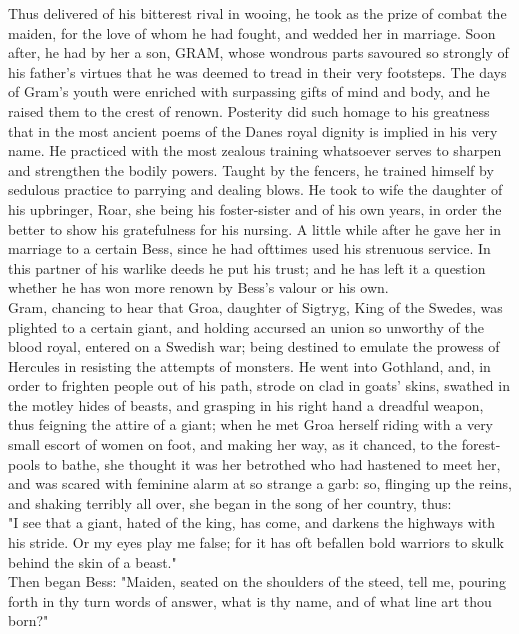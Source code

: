\documentclass[10pt,a4paper]{report}
\begin{document}
Thus delivered of his bitterest rival in wooing, he took as the prize of combat the maiden, for the love of whom he had fought, and wedded her in marriage. Soon after, he had by her a son, GRAM, whose wondrous parts savoured so strongly of his father's virtues that he was deemed to tread in their very footsteps. The days of Gram's youth were enriched with surpassing gifts of mind and body, and he raised them to the crest of renown. Posterity did such homage to his greatness that in the most ancient poems of the Danes royal dignity is implied in his very name. He practiced with the most zealous training whatsoever serves to sharpen and strengthen the bodily powers. Taught by the fencers, he trained himself by sedulous practice to parrying and dealing blows. He took to wife the daughter of his upbringer, Roar, she being his foster-sister and of his own years, in order the better to show his gratefulness for his nursing. A little while after he gave her in marriage to a certain Bess, since he had ofttimes used his strenuous service. In this partner of his warlike deeds he put his trust; and he has left it a question whether he has won more renown by Bess's valour or his own.\\

Gram, chancing to hear that Groa, daughter of Sigtryg, King of the Swedes, was plighted to a certain giant, and holding accursed an union so unworthy of the blood royal, entered on a Swedish war; being destined to emulate the prowess of Hercules in resisting the attempts of monsters. He went into Gothland, and, in order to frighten people out of his path, strode on clad in goats' skins, swathed in the motley hides of beasts, and grasping in his right hand a dreadful weapon, thus feigning the attire of a giant; when he met Groa herself riding with a very small escort of women on foot, and making her way, as it chanced, to the forest-pools to bathe, she thought it was her betrothed who had hastened to meet her, and was scared with feminine alarm at so strange a garb: so, flinging up the reins, and shaking terribly all over, she began in the song of her country, thus:\\

"I see that a giant, hated of the king, has come, and darkens the highways with his stride. Or my eyes play me false; for it has oft befallen bold warriors to skulk behind the skin of a beast."\\

Then began Bess: "Maiden, seated on the shoulders of the steed, tell me, pouring forth in thy turn words of answer, what is thy name, and of what line art thou born?"\\
\end{document}
